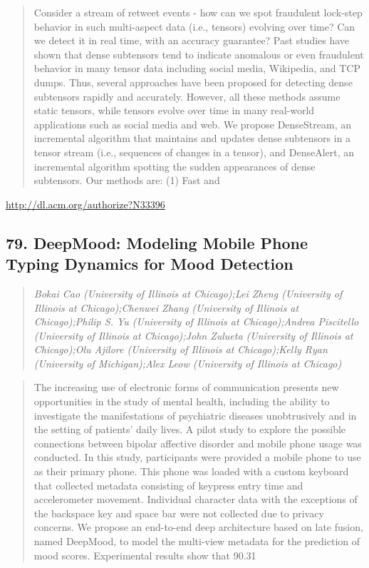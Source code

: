 \documentclass{article}
\begin{document}
\begin{quote}
Consider a stream of retweet events - how can we spot fraudulent lock-step behavior in such multi-aspect data (i.e., tensors) evolving over time? Can we detect it in real time, with an accuracy guarantee? Past studies have shown that dense subtensors tend to indicate anomalous or even fraudulent behavior in many tensor data including social media, Wikipedia, and TCP dumps. Thus, several approaches have been proposed for detecting dense subtensors rapidly and accurately. However, all these methods assume static tensors, while tensors evolve over time in many real-world applications such as social media and web. We propose DenseStream, an incremental algorithm that maintains and updates dense subtensors in a tensor stream (i.e., sequences of changes in a tensor), and DenseAlert, an incremental algorithm spotting the sudden appearances of dense subtensors. Our methods are: (1) Fast and
\end{quote}

\href{http://dl.acm.org/authorize?N33396}{http://dl.acm.org/authorize?N33396}

\subsection{79. DeepMood: Modeling Mobile Phone Typing Dynamics for Mood Detection}

\begin{quote}
\footnotesize{\textit{Bokai Cao (University of Illinois at Chicago);Lei Zheng (University of Illinois at Chicago);Chenwei Zhang (University of Illinois at Chicago);Philip S. Yu (University of Illinois at Chicago);Andrea Piscitello (University of Illinois at Chicago);John Zulueta (University of Illinois at Chicago);Olu Ajilore (University of Illinois at Chicago);Kelly Ryan (University of Michigan);Alex Leow (University of Illinois at Chicago)}}

\end{quote}

\begin{quote}
The increasing use of electronic forms of communication presents new opportunities in the study of mental health, including the ability to investigate the manifestations of psychiatric diseases unobtrusively and in the setting of patients’ daily lives. A pilot study to explore the possible connections between bipolar affective disorder and mobile phone usage was conducted. In this study, participants were provided a mobile phone to use as their primary phone. This phone was loaded with a custom keyboard that collected metadata consisting of keypress entry time and accelerometer movement. Individual character data with the exceptions of the backspace key and space bar were not collected due to privacy concerns. We propose an end-to-end deep architecture based on late fusion, named DeepMood, to model the multi-view metadata for the prediction of mood scores. Experimental results show that 90.31%
\end{quote}
\end{document}
